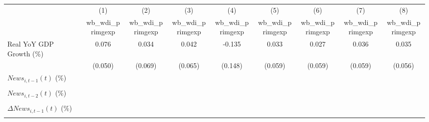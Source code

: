 {
\def\sym#1{\ifmmode^{#1}\else\(^{#1}\)\fi}
\begin{tabular}{l*{8}{c}}
\toprule
                    &\multicolumn{1}{c}{(1)}&\multicolumn{1}{c}{(2)}&\multicolumn{1}{c}{(3)}&\multicolumn{1}{c}{(4)}&\multicolumn{1}{c}{(5)}&\multicolumn{1}{c}{(6)}&\multicolumn{1}{c}{(7)}&\multicolumn{1}{c}{(8)}\\
                    &\multicolumn{1}{c}{wb_wdi_primgexp}&\multicolumn{1}{c}{wb_wdi_primgexp}&\multicolumn{1}{c}{wb_wdi_primgexp}&\multicolumn{1}{c}{wb_wdi_primgexp}&\multicolumn{1}{c}{wb_wdi_primgexp}&\multicolumn{1}{c}{wb_wdi_primgexp}&\multicolumn{1}{c}{wb_wdi_primgexp}&\multicolumn{1}{c}{wb_wdi_primgexp}\\
\midrule
Real YoY GDP Growth (\%)&       0.076         &       0.034         &       0.042         &      -0.135         &       0.033         &       0.027         &       0.036         &       0.035         \\
                    &     (0.050)         &     (0.069)         &     (0.065)         &     (0.148)         &     (0.059)         &     (0.059)         &     (0.059)         &     (0.056)         \\
\addlinespace
$ News_{i,t-1}(t)$ (\%)&                     &                     &                     &                     &                     &                     &                     &                     \\
                    &                     &                     &                     &                     &                     &                     &                     &                     \\
\addlinespace
$ News_{i,t-2}(t)$ (\%)&                     &                     &                     &                     &                     &                     &                     &                     \\
                    &                     &                     &                     &                     &                     &                     &                     &                     \\
\addlinespace
$ \Delta News_{i,t-1}(t)$ (\%)&                     &                     &                     &                     &                     &                     &                     &                     \\
                    &                     &                     &                     &                     &                     &                     &                     &                     \\

\end{tabular}}
